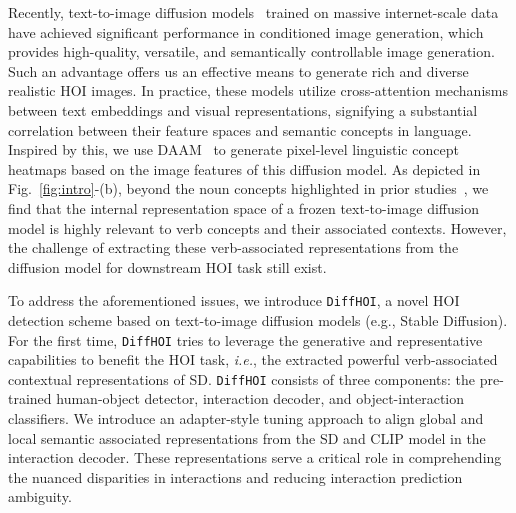 \documentclass{article}
\begin{document}
Recently, text-to-image diffusion models~\cite{balaji2022ediffi,zhou2022towards,saharia2022photorealistic,ramesh2022hierarchical,rombach2022high} trained on massive internet-scale data have achieved significant performance in conditioned image generation, which provides high-quality, versatile, and semantically controllable image generation. 
Such an advantage offers us an effective means to generate rich and diverse realistic HOI images.
In practice, these models utilize cross-attention mechanisms between text embeddings and visual representations, signifying a substantial correlation between their feature spaces and semantic concepts in language. 
Inspired by this, we use DAAM~\cite{tang2022daam} to generate pixel-level linguistic concept heatmaps based on the image features of this diffusion model. 
As depicted in Fig.~\ref{fig:intro}-(b), beyond the noun concepts highlighted in prior studies~\cite{xu2023open,li2023guiding,shiparddiversity}, we find that the internal representation space of a frozen text-to-image diffusion model is highly relevant to verb concepts and their associated contexts.  
However, the challenge of extracting these verb-associated representations from the diffusion model for downstream HOI task still exist.


To address the aforementioned issues, we introduce \texttt{DiffHOI}, a novel HOI detection scheme based on text-to-image diffusion models (e.g., Stable Diffusion). For the first time, \texttt{DiffHOI} tries to leverage the generative and representative capabilities to benefit the HOI task, \textit{i.e.}, the extracted powerful verb-associated contextual representations of SD. \texttt{DiffHOI} consists of three components: the pre-trained human-object detector, interaction decoder, and object-interaction classifiers. We introduce an adapter-style tuning approach to align global and local semantic associated representations from the SD and CLIP model in the interaction decoder. These representations serve a critical role in comprehending the nuanced disparities in interactions and reducing interaction prediction ambiguity.
\end{document}

